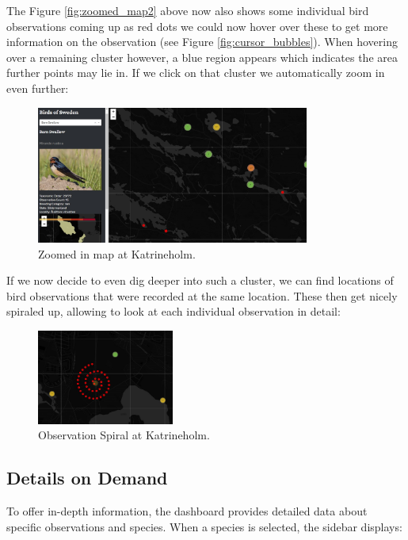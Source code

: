 The Figure \ref{fig:zoomed_map2} above now also shows some individual bird observations coming up as red dots we could now hover over these to get more information on the observation (see Figure \ref{fig:cursor_bubbles}). When hovering over a remaining cluster however, a blue region appears which indicates the area further points may lie in. If we click on that cluster we automatically zoom in even further:

\begin{figure}[h] 
    \centering 
    \includegraphics[width=0.8\textwidth]{figures/zoom_3.jpg} 
    \caption{Zoomed in map at Katrineholm.} 
    \label{fig:zoomed_map3} 
\end{figure}

If we now decide to even dig deeper into such a cluster, we can find locations of bird observations that were recorded at the same location. These then get nicely spiraled up, allowing to look at each individual observation in detail:

\begin{figure}[H] 
    \centering 
    \includegraphics[width=0.4\textwidth]{figures/zoom_spiral.jpg} 
    \caption{Observation Spiral at Katrineholm.} 
    \label{fig:zoomed_spiral} 
\end{figure}

\subsection{Details on Demand}

To offer in-depth information, the dashboard provides detailed data about specific observations and species. When a species is selected, the sidebar displays:

